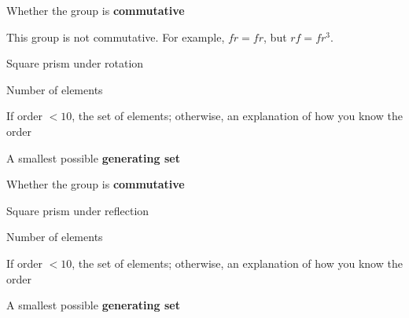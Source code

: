 \documentclass[../gatm_answers.tex]{subfiles}
\begin{document}
\begin{inner_problem}
\item Whether the group is \textbf{commutative}
\end{inner_problem}

This group is not commutative. For example, $fr=fr$, but $rf=fr^3$.

\begin{outer_problem}
\item Square prism under rotation
\end{outer_problem}

\begin{inner_problem}[start=1]
\item Number of elements
\end{inner_problem}

\begin{inner_problem}
\item If order $< 10$, the set of elements; otherwise, an explanation of how you know the order
\end{inner_problem}

\begin{inner_problem}
\item A smallest possible \textbf{generating set}
\end{inner_problem}

\begin{inner_problem}
\item Whether the group is \textbf{commutative}
\end{inner_problem}

\begin{outer_problem}
\item Square prism under reflection
\end{outer_problem}

\begin{inner_problem}[start=1]
\item Number of elements
\end{inner_problem}

\begin{inner_problem}
\item If order $< 10$, the set of elements; otherwise, an explanation of how you know the order
\end{inner_problem}

\begin{inner_problem}
\item A smallest possible \textbf{generating set}
\end{inner_problem}
\end{document}
